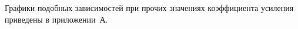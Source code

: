 Графики подобных зависимостей при прочих значениях коэффициента усиления приведены в приложении~А.











